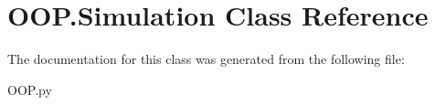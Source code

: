 \hypertarget{class_o_o_p_1_1_simulation}{}\section{O\+O\+P.\+Simulation Class Reference}
\label{class_o_o_p_1_1_simulation}


The documentation for this class was generated from the following file\+:\begin{DoxyCompactItemize}
\item 
O\+O\+P.\+py\end{DoxyCompactItemize}
